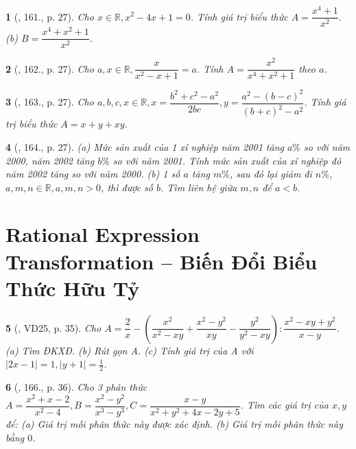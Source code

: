\documentclass{article}
\newtheorem{baitoan}{}
\begin{document}
\begin{baitoan}[\cite{Binh_Toan_8_tap_1}, 161., p. 27]
	Cho $x\in\mathbb{R},x^2 - 4x + 1 = 0$. Tính giá trị biểu thức $A = \dfrac{x^4 + 1}{x^2}$. (b) $B = \dfrac{x^4 + x^2 + 1}{x^2}$.
\end{baitoan}

\begin{baitoan}[\cite{Binh_Toan_8_tap_1}, 162., p. 27]
	Cho $a,x\in\mathbb{R},\dfrac{x}{x^2 - x + 1} = a$. Tính $A = \dfrac{x^2}{x^4 + x^2 + 1}$ theo $a$.
\end{baitoan}

\begin{baitoan}[\cite{Binh_Toan_8_tap_1}, 163., p. 27]
	Cho $a,b,c,x\in\mathbb{R},x = \dfrac{b^2 + c^2 - a^2}{2bc},y = \dfrac{a^2 - (b - c)^2}{(b + c)^2 - a^2}$. Tính giá trị biểu thức $A =  x + y + xy$.
\end{baitoan}

\begin{baitoan}[\cite{Binh_Toan_8_tap_1}, 164., p. 27]
	(a) Mức sản xuất của 1 xí nghiệp năm 2001 tăng $a\%$ so với năm 2000, năm 2002 tăng $b\%$ so với năm 2001. Tính mức sản xuất của xí nghiệp đó năm 2002 tăng so với năm 2000. (b) 1 số $a$ tăng $m\%$, sau đó lại giảm đi $n\%$, $a,m,n\in\mathbb{R},a,m,n > 0$, thì được số $b$. Tìm liên hệ giữa $m,n$ để $a < b$.
\end{baitoan}


\section{Rational Expression Transformation -- Biến Đổi Biểu Thức Hữu Tỷ}

\begin{baitoan}[\cite{Tuyen_Toan_8}, VD25, p. 35]
	Cho $A = \dfrac{2}{x} - \left(\dfrac{x^2}{x^2 - xy} + \dfrac{x^2 - y^2}{xy} - \dfrac{y^2}{y^2 - xy}\right):\dfrac{x^2 - xy + y^2}{x - y}$. (a) Tìm {\rm ĐKXĐ}. (b) Rút gọn A. (c) Tính giá trị của A với $|2x - 1| = 1,|y + 1| = \frac{1}{2}$.
\end{baitoan}

\begin{baitoan}[\cite{Tuyen_Toan_8}, 166., p. 36]
	Cho 3 phân thức $A = \dfrac{x^2 + x - 2}{x^2 - 4},B = \dfrac{x^2 - y^2}{x^3 - y^3},C = \dfrac{x - y}{x^2 + y^2 + 4x - 2y + 5}$. Tìm các giá trị của $x,y$ để: (a) Giá trị mỗi phân thức này được xác định. (b) Giá trị mỗi phân thức này bằng $0$.
\end{baitoan}
\end{document}
